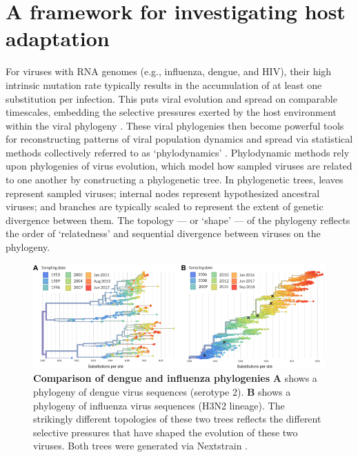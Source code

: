 \section{A framework for investigating host adaptation}
For viruses with RNA genomes (e.g., influenza, dengue, and HIV), their high intrinsic mutation rate typically results in the accumulation of at least one  substitution per infection.
This puts viral evolution and spread on comparable timescales, embedding the selective pressures exerted by the host environment within the viral phylogeny \citep{bedford2011strength}.
These viral phylogenies then become powerful tools for reconstructing patterns of viral population dynamics and spread via statistical methods collectively referred to as `phylodynamics' \citep{grenfell2004unifying}.
Phylodynamic methods rely upon phylogenies of virus evolution, which model how sampled viruses are related to one another by constructing a phylogenetic tree.
In phylogenetic trees, leaves represent sampled viruses; internal nodes represent hypothesized ancestral viruses; and branches are typically scaled to represent the extent of genetic divergence between them.
The topology --- or `shape' --- of the phylogeny reflects the order of `relatedness' and sequential divergence between viruses on the phylogeny.

\begin{figure}[ht!]
  \begin{centering}
    \includegraphics[width=\linewidth]{./png/dengue_vs_influenza.png}
  	\caption[Comparison of dengue and influenza phylogenies]{\textbf{Comparison of dengue and influenza phylogenies }
\textbf{A} shows a phylogeny of dengue virus sequences (serotype 2).
\textbf{B} shows a phylogeny of influenza virus sequences (H3N2 lineage).
The strikingly different topologies of these two trees reflects the different selective pressures that have shaped the evolution of these two viruses.
Both trees were generated via Nextstrain \citep{hadfield2017nextstrain}.
}
  	\label{dengue_vs_influenza}
  \end{centering}
\end{figure}

